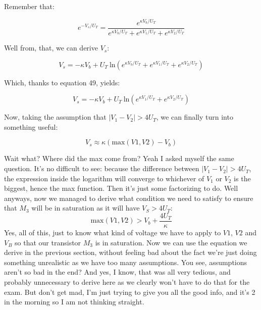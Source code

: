 Remember that: 

\begin{equation}
    e^{-V_s/U_T} = \frac{e^{\kappa V_b/U_T}}{e^{\kappa V_b/U_T} + e^{\kappa V_1/U_T} + e^{\kappa V_2/U_T}}
\end{equation}

Well from, that, we can derive $V_s$: 

\begin{equation}
    V_s = -\kappa V_b + U_T \ \mathrm{ln}(e^{\kappa V_b/U_T} + e^{\kappa V_1/U_T} + e^{\kappa V_2/U_T})
\end{equation}

Which, thanks to equation 49, yields: 

\begin{equation}
    V_s = -\kappa V_b + U_T \ \mathrm{ln}(e^{\kappa V_1/U_T} + e^{\kappa V_2/U_T})
\end{equation}

Now, taking the assumption that $|V_1 - V_2| > 4 U_T$, we can finally turn into something useful:

\begin{equation}
    V_s \approx \kappa (\textrm{max}(V1,V2) - V_b)
\end{equation}

Wait what? Where did the max come from? Yeah I asked myself the same question. It's no difficult to see: because the difference between $|V_1 - V_2| > 4 U_T $, the expression inside the logarithm will converge to whichever of $V_1$ or $V_2$ is the biggest, hence the max function. Then it's just some factorizing to do. Well anyways, now we managed to derive what condition we need to satisfy to ensure that $M_3$ will be in saturation as it will have $V_S > 4 U_T$:
\begin{equation}
    \textrm{max}(V1,V2) > V_b + \frac{4U_T}{\kappa}
\end{equation}
Yes, all of this, just to know what kind of voltage we have to apply to $V1$, $V2$ and $V_B$ so that our transistor $M_3$ is in saturation. Now we can use the equation we derive in the previous section, without feeling bad about the fact we're just doing something unrealistic as we have too many assumptions. You see, assumptions aren't so bad in the end?  And yes, I know, that was all very tedious, and probably unnecessary to derive here as we clearly won't have to do that for the exam. But don't get mad, I'm just trying to give you all the good info, and it's 2 in the morning so I am not thinking straight. 

